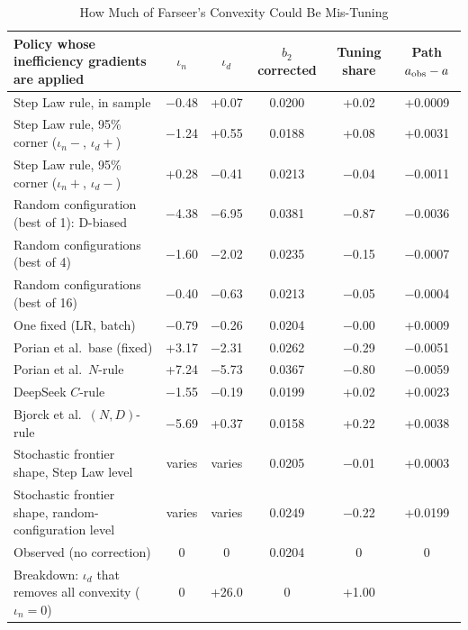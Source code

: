 \begin{table}[tp]
\centering
\caption{How Much of Farseer's Convexity Could Be Mis-Tuning}
\label{tab:app-tuning}
\footnotesize
\setlength{\tabcolsep}{3pt}
\begin{tabular*}{\textwidth}{@{\extracolsep{\fill}}>{\raggedright\arraybackslash}p{}ccccc@{}}
\toprule
Policy whose inefficiency gradients are applied & $\iota_n$ & $\iota_d$ & $b_2$ corrected & Tuning share & Path $a_{\rm obs}-a$ \\
\midrule
Step Law rule, in sample & $-$0.48 & +0.07 & 0.0200 & +0.02 & +0.0009 \\
Step Law rule, 95\% corner ($\iota_n-$, $\iota_d+$) & $-$1.24 & +0.55 & 0.0188 & +0.08 & +0.0031 \\
Step Law rule, 95\% corner ($\iota_n+$, $\iota_d-$) & +0.28 & $-$0.41 & 0.0213 & $-$0.04 & $-$0.0011 \\
Random configuration (best of 1): D-biased & $-$4.38 & $-$6.95 & 0.0381 & $-$0.87 & $-$0.0036 \\
Random configurations (best of 4) & $-$1.60 & $-$2.02 & 0.0235 & $-$0.15 & $-$0.0007 \\
Random configurations (best of 16) & $-$0.40 & $-$0.63 & 0.0213 & $-$0.05 & $-$0.0004 \\
One fixed (LR, batch) & $-$0.79 & $-$0.26 & 0.0204 & $-$0.00 & +0.0009 \\
Porian et al.\ base (fixed) & +3.17 & $-$2.31 & 0.0262 & $-$0.29 & $-$0.0051 \\
Porian et al.\ $N$-rule & +7.24 & $-$5.73 & 0.0367 & $-$0.80 & $-$0.0059 \\
DeepSeek $C$-rule & $-$1.55 & $-$0.19 & 0.0199 & +0.02 & +0.0023 \\
Bjorck et al.\ $(N,D)$-rule & $-$5.69 & +0.37 & 0.0158 & +0.22 & +0.0038 \\
Stochastic frontier shape, Step Law level & varies & varies & 0.0205 & $-$0.01 & +0.0003 \\
Stochastic frontier shape, random-configuration level & varies & varies & 0.0249 & $-$0.22 & +0.0199 \\
\addlinespace
Observed (no correction) & 0 & 0 & 0.0204 & 0 & 0 \\
Breakdown: $\iota_d$ that removes all convexity ($\iota_n=0$) & 0 & +26.0 & 0 & +1.00 & \\
\bottomrule
\end{tabular*}


\end{table}
